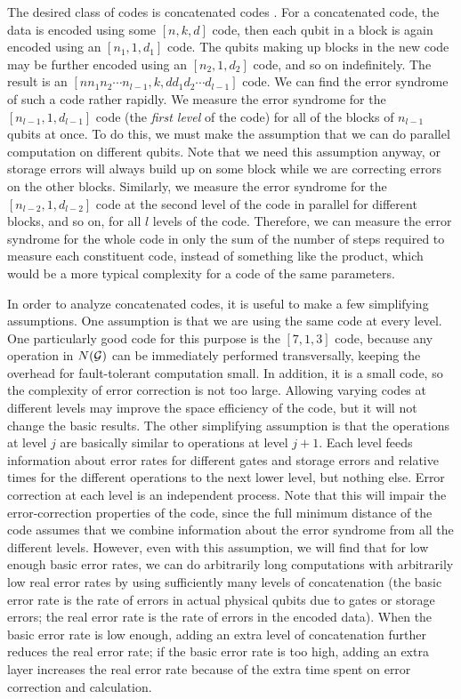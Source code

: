 \documentclass{report}
\newcommand{\G}{{\cal G}}
\begin{document}
The desired class of codes is concatenated codes
\cite{aharonov,knill-concatenate2,knill-concatenate1,zalka}.  For a 
concatenated code, the data is encoded using some $[n, k, d]$ code, then 
each qubit in a block is again encoded using an $[n_1, 1, d_1]$ code.  The 
qubits making up blocks in the new code may be further encoded using an 
$[n_2, 1, d_2]$ code, and so on indefinitely.  The result is an $[n n_1 n_2 
\cdots n_{l-1}, k, d d_1 d_2 \cdots d_{l-1}]$ code.  We can find the error 
syndrome of such a code rather rapidly.  We measure the error syndrome 
for the $[n_{l-1}, 1, d_{l-1}]$ code (the {\em first level} of the code) for 
all of the blocks of $n_{l-1}$ qubits at once.  To do this, we must make the 
assumption that we can do parallel computation on different qubits.  Note 
that we need this assumption anyway, or storage errors will always build 
up on some block while we are correcting errors on the other blocks.  
Similarly, we measure the error syndrome for the $[n_{l-2}, 1, d_{l-2}]$ 
code at the second level of the code in parallel for different blocks, and so 
on, for all $l$ levels of the code.  Therefore, we can measure the error 
syndrome for the whole code in only the sum of the number of steps 
required to measure each constituent code, instead of something like the 
product, which would be a more typical complexity for a code of the same 
parameters.

In order to analyze concatenated codes, it is useful to make a few 
simplifying assumptions.  One assumption is that we are using the same 
code at every level.  One particularly good code for this purpose is the 
$[7,1,3]$ code, because any operation in $N(\G)$ can be immediately 
performed transversally, keeping the overhead for fault-tolerant 
computation small.  In addition, it is a small code, so the complexity of 
error correction is not too large.  Allowing varying codes at different levels 
may improve the space efficiency of the code, but it will not change the 
basic results.  The other simplifying assumption is that the operations at 
level $j$ are basically similar to operations at level $j+1$.  Each level feeds 
information about error rates for different gates and storage errors and 
relative times for the different operations to the next lower level, but 
nothing else.  Error correction at each level is an independent process.  
Note that this will impair the error-correction properties of the code, since 
the full minimum distance of the code assumes that we combine 
information about the error syndrome from all the different levels.  
However, even with this assumption, we will find that for low enough basic 
error rates, we can do arbitrarily long computations with arbitrarily low 
real error rates by using sufficiently many levels of concatenation (the 
basic error rate is the rate of errors in actual physical qubits due to gates 
or storage errors; the real error rate is the rate of errors in the encoded 
data).  When the basic error rate is low enough, adding an extra level of
concatenation further reduces the real error rate; if the basic error rate
is too high, adding an extra layer increases the real error rate because of
the extra time spent on error correction and calculation.
\end{document}
